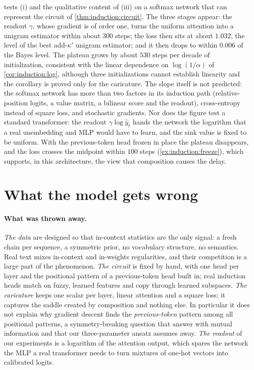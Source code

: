 \begin{refsection}
 tests (i) and the qualitative content of (iii) on a softmax network that can represent the circuit of \cref{thm:induction:circuit}. The three stages appear: the readout $\gamma$, whose gradient is of order one, turns the uniform attention into a unigram estimator within about $300$ steps; the loss then sits at about $1.032$, the level of the best add-$\kappa'$ unigram estimator; and it then drops to within $0.006$ of the Bayes level. The plateau grows by about $530$ steps per decade of initialization, consistent with the linear dependence on $\log(1/\alpha)$ of \cref{cor:induction:log}, although three initializations cannot establish linearity and the corollary is proved only for the caricature. The slope itself is not predicted: the softmax network has more than two factors in its induction path (relative-position logits, a value matrix, a bilinear score and the readout), cross-entropy instead of square loss, and stochastic gradients. Nor does the figure test a standard transformer: the readout $\gamma\log\hat y_t$ hands the network the logarithm that a real unembedding and MLP would have to learn, and the sink value is fixed to be uniform. With the previous-token head frozen in place the plateau disappears, and the loss crosses the midpoint within $100$ steps (\cref{ex:induction:freeze}), which supports, in this architecture, the view that composition causes the delay.

\section{What the model gets wrong}\label{sec:induction:wrong}

\paragraph{What was thrown away.} \emph{The data} are designed so that in-context statistics are the only signal: a fresh chain per sequence, a symmetric prior, no vocabulary structure, no semantics. Real text mixes in-context and in-weights regularities, and their competition is a large part of the phenomenon. \emph{The circuit} is fixed by hand, with one head per layer and the positional pattern of a previous-token head built in; real induction heads match on fuzzy, learned features and copy through learned subspaces. \emph{The caricature} keeps one scalar per layer, linear attention and a square loss; it captures the saddle created by composition and nothing else. In particular it does not explain why gradient descent finds the \emph{previous-token} pattern among all positional patterns, a symmetry-breaking question that \textcite{NichaniEtAl2024} answer with mutual information and that our three-parameter ansatz assumes away. \emph{The readout} of our experiments is a logarithm of the attention output, which spares the network the MLP a real transformer needs to turn mixtures of one-hot vectors into calibrated logits.


\end{refsection}
